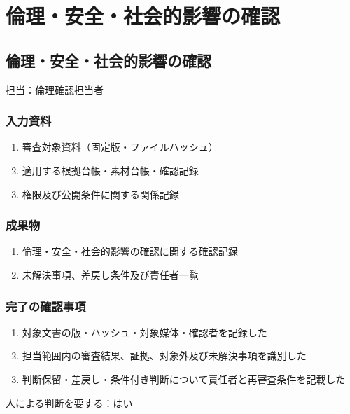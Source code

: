 \documentclass[a4paper,11pt]{article}
\begin{document}
\section{倫理・安全・社会的影響の確認}
\subsection{倫理・安全・社会的影響の確認}
\par 担当：倫理確認担当者\par\medskip
\subsubsection*{入力資料}
\begin{enumerate}[leftmargin=2em,itemsep=0.35em]
\item 審査対象資料（固定版・ファイルハッシュ）
\item 適用する根拠台帳・素材台帳・確認記録
\item 権限及び公開条件に関する関係記録
\end{enumerate}
\subsubsection*{成果物}
\begin{enumerate}[leftmargin=2em,itemsep=0.35em]
\item 倫理・安全・社会的影響の確認に関する確認記録
\item 未解決事項、差戻し条件及び責任者一覧
\end{enumerate}
\subsubsection*{完了の確認事項}
\begin{enumerate}[leftmargin=2em,itemsep=0.35em]
\item 対象文書の版・ハッシュ・対象媒体・確認者を記録した
\item 担当範囲内の審査結果、証拠、対象外及び未解決事項を識別した
\item 判断保留・差戻し・条件付き判断について責任者と再審査条件を記載した
\end{enumerate}
\par 人による判断を要する：はい\par\medskip
\end{document}
